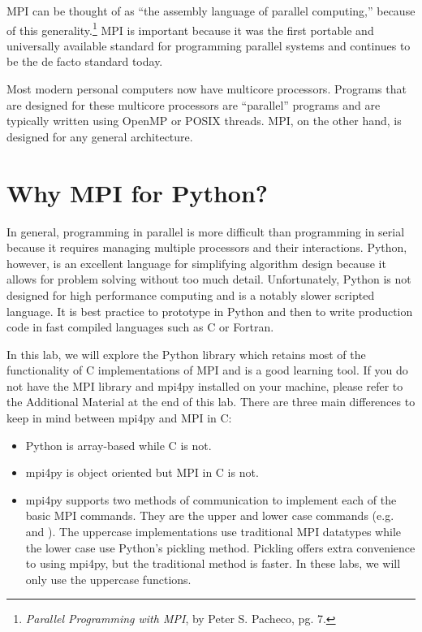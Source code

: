 MPI can be thought of as ``the assembly language of parallel computing,'' because of this generality.\footnote{\emph{Parallel Programming with MPI}, by Peter S. Pacheco, pg. 7.}
MPI is important because it was the first portable and universally available standard for programming parallel systems and continues to be the de facto standard today.

\begin{info}
Most modern personal computers now have multicore processors.
Programs that are designed for these multicore processors are ``parallel'' programs and are typically written using OpenMP or POSIX threads.
MPI, on the other hand, is designed for any general architecture.
\end{info}

\section*{Why MPI for Python?}
In general, programming in parallel is more difficult than programming in serial because it requires managing multiple processors and their interactions.
Python, however, is an excellent language for simplifying algorithm design because it allows for problem solving without too much detail.
Unfortunately, Python is not designed for high performance computing and is a notably slower scripted language.
It is best practice to prototype in Python and then to write production code in fast compiled languages such as C or Fortran.

In this lab, we will explore the Python library  which retains most of the functionality of C implementations of MPI and is a good learning tool.
If you do not have the MPI library and mpi4py installed on your machine, please refer to the Additional Material at the end of this lab.
There are three main differences to keep in mind between mpi4py and MPI in C:
\begin{itemize}
    \item Python is array-based while C is not.
    \item mpi4py is object oriented but MPI in C is not.
    \item mpi4py supports two methods of communication to implement each of the basic MPI commands.
    They are the upper and lower case commands (e.g.  and ).
    The uppercase implementations use traditional MPI datatypes while the lower case use
    Python's pickling method. Pickling offers extra convenience to using mpi4py,
    but the traditional method is faster. In these labs, we will only use the uppercase functions.
\end{itemize}


